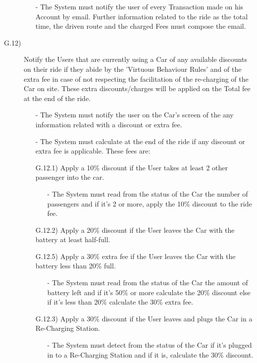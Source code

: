 \documentclass[a4paper]{article}
\begin{document}
\begin{description}
\begin{itemize}
	\item[-]The System must notify the user of every Transaction made on his Account by email. Further information related to the ride as the total time, the driven route and the charged Fees must compose the email.
\end{itemize}
\item [G.12)]Notify the Users that are currently using a Car of any available discounts on their ride if they abide by the 'Virtuous Behaviour Rules' and of the extra fee in case of not respecting the facilitation of the re-charging of the Car on site. These extra discounts/charges will be applied on the Total fee at the end of the ride.
\begin{itemize}
	\item[-]The System must notify the user on the Car's screen of the any information related with a discount or extra fee.
  	\item[-]The System must calculate at the end of the ride if any discount or extra fee is applicable. These fees are:
	\item [G.12.1)]Apply a 10\% discount if the User takes at least 2 other passenger into the car.
	\begin{itemize}
	\item[-]The System must read from the status of the Car the number of passengers and if it's 2 or more, apply the 10\% discount to the ride fee.
	\end{itemize}
	\item [G.12.2)]Apply a 20\% discount if the User leaves the Car with the battery at least half-full.
	\item [G.12.5)]Apply a 30\% extra fee if the User leaves the Car with the battery less than 20\% full.
	\begin{itemize}
	\item[-]The System must read from the status of the Car the amount of battery left and if it's 50\% or more calculate the 20\% discount else if it's less than 20\% calculate the 30\% extra fee.
	\end{itemize}
	\item [G.12.3)]Apply a 30\% discount if the User leaves and plugs the Car in a Re-Charging Station.
	\begin{itemize}
	\item[-]The System must detect from the status of the Car if it's plugged in to a Re-Charging Station and if it is, calculate the 30\% discount.
	\end{itemize}

\end{itemize}
\end{description}
\end{document}
